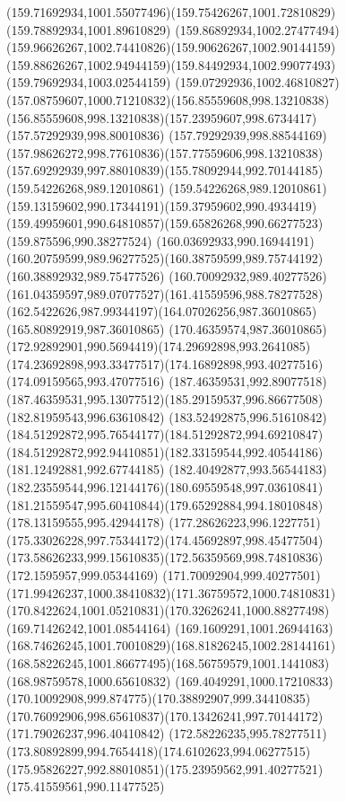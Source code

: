 {{\curveto(159.71692934,1001.55077496)(159.75426267,1001.72810829)(159.78892934,1001.89610829)
\curveto(159.86892934,1002.27477494)(159.96626267,1002.74410826)(159.90626267,1002.90144159)
\curveto(159.88626267,1002.94944159)(159.84492934,1002.99077493)(159.79692934,1003.02544159)
\curveto(159.07292936,1002.46810827)(157.08759607,1000.71210832)(156.85559608,998.13210838)
\curveto(156.85559608,998.13210838)(157.23959607,998.6734417)(157.57292939,998.80010836)
\curveto(157.79292939,998.88544169)(157.98626272,998.77610836)(157.77559606,998.13210838)
\curveto(157.69292939,997.88010839)(155.78092944,992.70144185)(159.54226268,989.12010861)
\curveto(159.54226268,989.12010861)(159.13159602,990.17344191)(159.37959602,990.4934419)
\curveto(159.49959601,990.64810857)(159.65826268,990.66277523)(159.875596,990.38277524)
\curveto(160.03692933,990.16944191)(160.20759599,989.96277525)(160.38759599,989.75744192)
\lineto(160.38892932,989.75477526)
\curveto(160.70092932,989.40277526)(161.04359597,989.07077527)(161.41559596,988.78277528)
\curveto(162.5422626,987.99344197)(164.07026256,987.36010865)(165.80892919,987.36010865)
\curveto(170.46359574,987.36010865)(172.92892901,990.5694419)(174.29692898,993.2641085)
\curveto(174.23692898,993.33477517)(174.16892898,993.40277516)(174.09159565,993.47077516)
\moveto(187.46359531,992.89077518)
\curveto(187.46359531,995.13077512)(185.29159537,996.86677508)(182.81959543,996.63610842)
\curveto(183.52492875,996.51610842)(184.51292872,995.76544177)(184.51292872,994.69210847)
\curveto(184.51292872,992.94410851)(182.33159544,992.40544186)(181.12492881,992.67744185)
\curveto(182.40492877,993.56544183)(182.23559544,996.12144176)(180.69559548,997.03610841)
\curveto(181.21559547,995.60410844)(179.65292884,994.18010848)(178.13159555,995.42944178)
\curveto(177.28626223,996.1227751)(175.33026228,997.75344172)(174.45692897,998.45477504)
\curveto(173.58626233,999.15610835)(172.56359569,998.74810836)(172.1595957,999.05344169)
\curveto(171.70092904,999.40277501)(171.99426237,1000.38410832)(171.36759572,1000.74810831)
\curveto(170.8422624,1001.05210831)(170.32626241,1000.88277498)(169.71426242,1001.08544164)
\curveto(169.1609291,1001.26944163)(168.74626245,1001.70010829)(168.81826245,1002.28144161)
\curveto(168.58226245,1001.86677495)(168.56759579,1001.1441083)(168.98759578,1000.65610832)
\curveto(169.4049291,1000.17210833)(170.10092908,999.874775)(170.38892907,999.34410835)
\curveto(170.76092906,998.65610837)(170.13426241,997.70144172)(171.79026237,996.40410842)
\curveto(172.58226235,995.78277511)(173.80892899,994.7654418)(174.6102623,994.06277515)
\curveto(175.95826227,992.88010851)(175.23959562,991.40277521)(175.41559561,990.11477525)
}}
